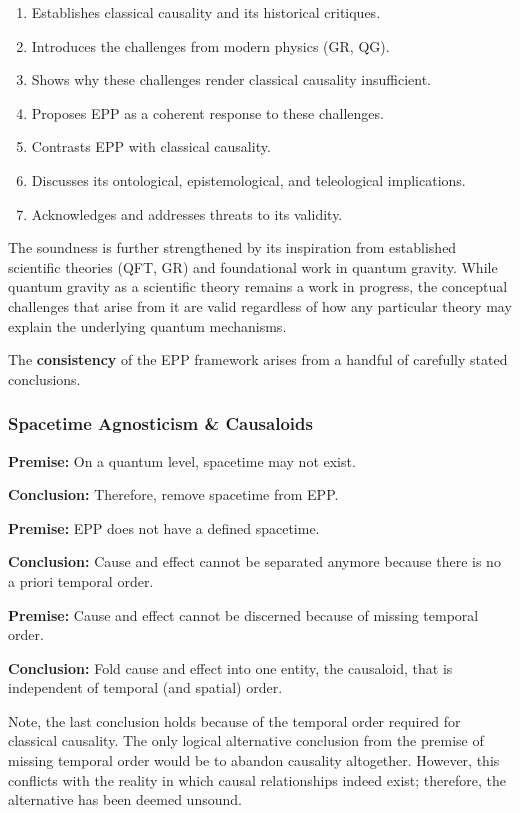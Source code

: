 \documentclass{article}
\begin{document}
\begin{enumerate}
    \item Establishes classical causality and its historical critiques.
    \item Introduces the challenges from modern physics (GR, QG).
    \item Shows why these challenges render classical causality insufficient.
    \item Proposes EPP as a coherent response to these challenges.
    \item Contrasts EPP with classical causality.
    \item Discusses its ontological, epistemological, and teleological implications.
    \item Acknowledges and addresses threats to its validity.
\end{enumerate}

The soundness is further strengthened by its inspiration from established scientific theories (QFT, GR) and foundational work in quantum gravity. While quantum gravity as a scientific theory remains a work in progress, the conceptual challenges that arise from it are valid regardless of how any particular theory may explain the underlying quantum mechanisms.


The \textbf{consistency} of the EPP framework arises from a handful of carefully stated conclusions.

\subsubsection{Spacetime Agnosticism \& Causaloids}

\textbf{Premise:} On a quantum level, spacetime may not exist.

\textbf{Conclusion:} Therefore, remove spacetime from EPP.

\textbf{Premise:} EPP does not have a defined spacetime.

\textbf{Conclusion:} Cause and effect cannot be separated anymore because there is no a priori temporal order.

\textbf{Premise:} Cause and effect cannot be discerned because of missing temporal order.

\textbf{Conclusion:} Fold cause and effect into one entity, the causaloid, that is independent of temporal (and spatial) order.

Note, the last conclusion holds because of the temporal order required for classical causality. The only logical alternative conclusion from the premise of missing temporal order would be to abandon causality altogether. However, this conflicts with the reality in which causal relationships indeed exist; therefore, the alternative has been deemed unsound.
\end{document}
